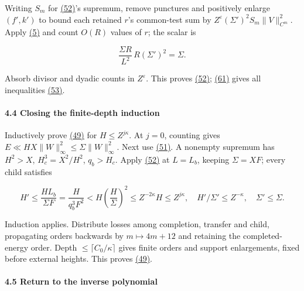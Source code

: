 Writing \(S_m\) for \protect\hyperlink{cf:eq:C.8}{(52)}'s supremum, remove punctures and positively enlarge \((f',k')\) to bound each retained \(r\)'s common-test sum by \(Z^\varepsilon(\Sigma')^2S_m\|V\|_{C^m}^2\). Apply \protect\hyperlink{cf:eq:1.4}{(5)} and count \(O(R)\) values of \(r\); the scalar is

\[
\frac{\Sigma R}{L^2}\,R(\Sigma')^2=\Sigma.
\]

Absorb divisor and dyadic counts in \(Z^\varepsilon\). This proves \protect\hyperlink{cf:eq:C.8}{(52)}; \protect\hyperlink{cf:eq:C.17}{(61)} gives all inequalities \protect\hyperlink{cf:eq:C.9}{(53)}.

\hypertarget{cf:sec:C.4}{}

\label{cf:sec:C.4}

\hypertarget{closing-the-finite-depth-induction}{%
\paragraph{4.4 Closing the finite-depth induction}\label{closing-the-finite-depth-induction}}

Inductively prove \protect\hyperlink{cf:eq:C.5}{(49)} for \(H\le Z^{j\kappa}\). At \(j=0\), counting gives \(E\ll HX\|W\|_\infty^2\le\Sigma\|W\|_\infty^2\). Next use \protect\hyperlink{cf:eq:C.7}{(51)}. A nonempty supremum has \(H^2>X\), \(H_c^3=X^2/H^2\), \(q_b>H_c\). Apply \protect\hyperlink{cf:eq:C.8}{(52)} at \(L=L_b\), keeping \(\Sigma=XF\); every child satisfies

\[
H'\le\frac{HL_b}{\Sigma F}=\frac H{q_b^3F^2}
<H\left(\frac H\Sigma\right)^2
\le Z^{-2\kappa}H\le Z^{j\kappa},
\quad H'/\Sigma'\le Z^{-\kappa},\quad \Sigma'\le\Sigma.
\]

Induction applies. Distribute losses among completion, transfer and child, propagating orders backwards by \(m\mapsto4m+12\) and retaining the completed-energy order. Depth \(\le\lceil C_0/\kappa\rceil\) gives finite orders and support enlargements, fixed before external heights. This proves \protect\hyperlink{cf:eq:C.5}{(49)}.

\hypertarget{cf:sec:C.5}{}

\label{cf:sec:C.5}

\hypertarget{return-to-the-inverse-polynomial}{%
\paragraph{4.5 Return to the inverse polynomial}\label{return-to-the-inverse-polynomial}}

